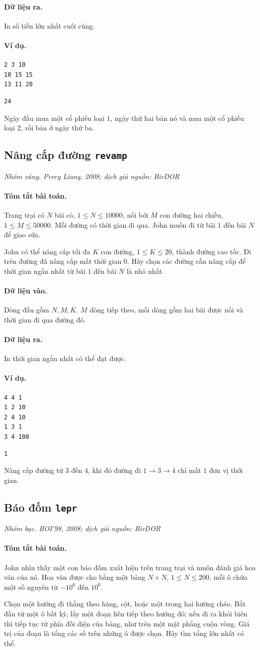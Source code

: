 \documentclass[11pt]{article}
\newcommand{\problem}[4]{%
  \subsection[#1 (#2)]{#1 \hfill {\normalsize\texttt{#2}}}%
  \noindent\textit{#3. #4}\par\smallskip
}
\newcommand{\iosec}[1]{\paragraph{#1}}
\begin{document}
\iosec{Dữ liệu ra.}
In số tiền lớn nhất cuối cùng.

\iosec{Ví dụ.}
\begin{verbatim}
2 3 10
10 15 15
13 11 20
\end{verbatim}

\begin{verbatim}
24
\end{verbatim}

Ngày đầu mua một cổ phiếu loại \(1\), ngày thứ hai bán nó và mua một cổ phiếu
loại \(2\), rồi bán ở ngày thứ ba.

\problem{Nâng cấp đường}{revamp}{Nhóm vàng}{Percy Liang, 2008; dịch giả nguồn: BirDOR}

\iosec{Tóm tắt bài toán.}
Trang trại có \(N\) bãi cỏ, \(1\le N\le 10000\), nối bởi \(M\) con đường
hai chiều, \(1\le M\le 50000\). Mỗi đường có thời gian đi qua. John muốn đi
từ bãi \(1\) đến bãi \(N\) để giao sữa.

John có thể nâng cấp tối đa \(K\) con đường, \(1\le K\le 20\), thành đường
cao tốc. Đi trên đường đã nâng cấp mất thời gian \(0\). Hãy chọn các đường
cần nâng cấp để thời gian ngắn nhất từ bãi \(1\) đến bãi \(N\) là nhỏ nhất.

\iosec{Dữ liệu vào.}
Dòng đầu gồm \(N,M,K\). \(M\) dòng tiếp theo, mỗi dòng gồm hai bãi được nối
và thời gian đi qua đường đó.

\iosec{Dữ liệu ra.}
In thời gian ngắn nhất có thể đạt được.

\iosec{Ví dụ.}
\begin{verbatim}
4 4 1
1 2 10
2 4 10
1 3 1
3 4 100
\end{verbatim}

\begin{verbatim}
1
\end{verbatim}

Nâng cấp đường từ \(3\) đến \(4\), khi đó đường đi \(1\to3\to4\) chỉ mất
\(1\) đơn vị thời gian.

\problem{Báo đốm}{lepr}{Nhóm bạc}{BOI'98, 2008; dịch giả nguồn: BirDOR}

\iosec{Tóm tắt bài toán.}
John nhìn thấy một con báo đốm xuất hiện trên trang trại và muốn đánh giá
hoa văn của nó. Hoa văn được cho bằng một bảng \(N\times N\),
\(1\le N\le 200\), mỗi ô chứa một số nguyên từ \(-10^6\) đến \(10^6\).

Chọn một hướng đi thẳng theo hàng, cột, hoặc một trong hai hướng chéo. Bắt
đầu từ một ô bất kỳ, lấy một đoạn liên tiếp theo hướng đó; nếu đi ra khỏi
biên thì tiếp tục từ phía đối diện của bảng, như trên một mặt phẳng cuộn vòng.
Giá trị của đoạn là tổng các số trên những ô được chọn. Hãy tìm tổng lớn
nhất có thể.
\end{document}
